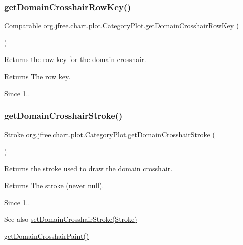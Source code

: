 \subsubsection{\texorpdfstring{get\+Domain\+Crosshair\+Row\+Key()}{getDomainCrosshairRowKey()}}
{\footnotesize\ttfamily Comparable org.\+jfree.\+chart.\+plot.\+Category\+Plot.\+get\+Domain\+Crosshair\+Row\+Key (\begin{DoxyParamCaption}{ }\end{DoxyParamCaption})}

Returns the row key for the domain crosshair.

\begin{DoxyReturn}{Returns}
The row key.
\end{DoxyReturn}
\begin{DoxySince}{Since}
1.. 
\end{DoxySince}
\mbox{\label{classorg_1_1jfree_1_1chart_1_1plot_1_1_category_plot_a87294a333f0a33da9ea7785774a7920f}} 
\subsubsection{\texorpdfstring{get\+Domain\+Crosshair\+Stroke()}{getDomainCrosshairStroke()}}
{\footnotesize\ttfamily Stroke org.\+jfree.\+chart.\+plot.\+Category\+Plot.\+get\+Domain\+Crosshair\+Stroke (\begin{DoxyParamCaption}{ }\end{DoxyParamCaption})}

Returns the stroke used to draw the domain crosshair.

\begin{DoxyReturn}{Returns}
The stroke (never {\ttfamily null}).
\end{DoxyReturn}
\begin{DoxySince}{Since}
1..
\end{DoxySince}
\begin{DoxySeeAlso}{See also}
\mbox{\hyperlink{classorg_1_1jfree_1_1chart_1_1plot_1_1_category_plot_af1fe2517f279b99a87890ee816451801}{set\+Domain\+Crosshair\+Stroke(\+Stroke)}} 

\mbox{\hyperlink{classorg_1_1jfree_1_1chart_1_1plot_1_1_category_plot_af251f4c3084a499f54915e07d09ba19c}{get\+Domain\+Crosshair\+Paint()}} 
\end{DoxySeeAlso}
\mbox{\label{classorg_1_1jfree_1_1chart_1_1plot_1_1_category_plot_a6fb5fd2f2f6b005667d2b0787385e5ae}} 
